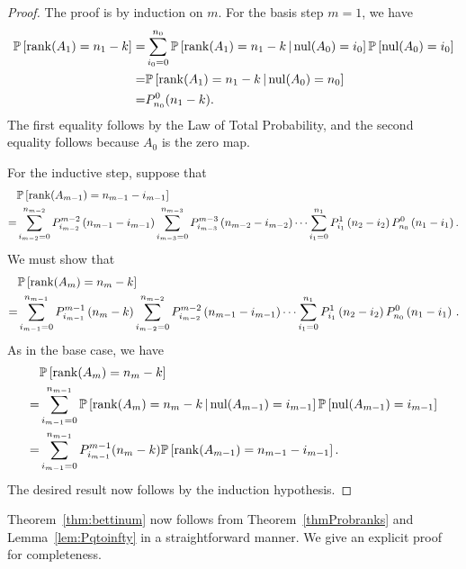 \begin{proof}
The proof is by induction on $m$. For the basis step $m=1$, we have
\begin{align*}
\mathbb{P}\left[\operatorname{\mathrm{rank}}(A_1) = n_1 - k\right]
	=& \sum_{i_0=0}^{n_0}\mathbb{P}\left [\operatorname{\mathrm{rank}}(A_1)= n_1 - k\,|\,\mathrm{nul} (A_0) = i_0\right]
		\mathbb{P}\left[\mathrm{nul}(A_0) = i_0 \right]\\
	=& \mathbb{P}\left [\operatorname{\mathrm{rank}}(A_1)= n_1 - k\,|\,\mathrm{nul} (A_0) = n_0\right]\\
	=& P_{n_0}^0(n_1 - k).
\end{align*}
The first equality follows by the Law of Total Probability, and the second equality follows because $A_0$ is the zero map.

For the inductive step, suppose that
\begin{align*}
 &  \mathbb{P}\left[\operatorname{\mathrm{rank}}(A_{m-1}) = n_{m-1} - i_{m-1}\right]\\
=& 	\sum_{i_{m-2}=0}^{n_{m-2}} P_{i_{m-2}}^{m-2}\left(n_{m-1} -i_{m-1}\right)
	\sum_{i_{m-3}=0}^{n_{m-3}} P_{i_{m-3}}^{m-3}\left(n_{m-2} - i_{m-2}\right)
		\cdots
	\sum_{i_1 = 0}^{n_1} P_{i_1}^1\left(n_2 - i_2\right) P_{n_0}^0 \left(n_1 - i_1\right).
\end{align*}
We must show that
\begin{align*}
  &  \mathbb{P}\left[\operatorname{\mathrm{rank}}(A_{m}) = n_{m} - k\right]\\
  =& 	\sum_{i_{m-1}=0}^{n_{m-1}} P_{i_{m-1}}^{m-1}\left(n_{m} -k\right)
  \sum_{i_{m-2}=0}^{n_{m-2}} P_{i_{m-2}}^{m-2}\left(n_{m-1} - i_{m-1}\right)
  \cdots
  \sum_{i_1 = 0}^{n_1} P_{i_1}^1\left(n_2 - i_2\right) P_{n_0}^0 \left(n_1 - i_1\right) \, .
\end{align*}
As in the base case, we have 
\begin{align*}
   & \mathbb{P}\left[\operatorname{\mathrm{rank}}(A_{m}) = n_{m} - k\right]\\
  =& \sum_{i_{m-1}=0}^{n_{m-1}} \mathbb{P}\left[ \operatorname{\mathrm{rank}}(A_{m}) = n_{m} - k  
  		\,|\, \mathrm{nul}(A_{m-1}) = i_{m-1}\right] \mathbb{P}\left[\mathrm{nul}(A_{m-1}) = i_{m-1}\right]\\
  =& \sum_{i_{m-1}=0}^{n_{m-1}} P_{i_{m-1}}^{m-1}(n_{m} - k)
  		\mathbb{P}\left[\operatorname{\mathrm{rank}}(A_{m-1}) = n_{m-1}- i_{m-1}\right].
\end{align*}
The desired result now follows by the induction hypothesis.
\end{proof}

Theorem~\ref{thm:bettinum} now follows from Theorem~\ref{thmProbranks} and 
Lemma~\ref{lem:Pqtoinfty} in a straightforward manner. We give an explicit proof
for completeness.

